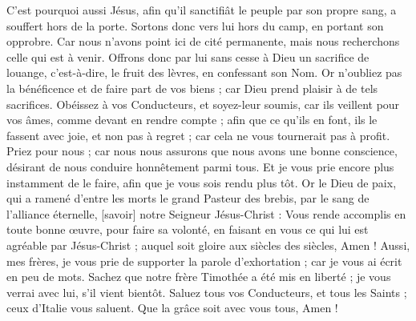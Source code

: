 \begin{multicols}{2}
C'est pourquoi aussi Jésus, afin qu'il sanctifiât le peuple par son propre sang, a souffert hors de la porte.
Sortons donc vers lui hors du camp, en portant son opprobre.
Car nous n'avons point ici de cité permanente, mais nous recherchons celle qui est à venir.
Offrons donc par lui sans cesse à Dieu un sacrifice de louange, c'est-à-dire, le fruit des lèvres, en confessant son Nom.
Or n'oubliez pas la bénéficence et de faire part de vos biens ; car Dieu prend plaisir à de tels sacrifices.
Obéissez à vos Conducteurs, et soyez-leur soumis, car ils veillent pour vos âmes, comme devant en rendre compte ; afin que ce qu'ils en font, ils le fassent avec joie, et non pas à regret ; car cela ne vous tournerait pas à profit.
Priez pour nous ; car nous nous assurons que nous avons une bonne conscience, désirant de nous conduire honnêtement parmi tous.
Et je vous prie encore plus instamment de le faire, afin que je vous sois rendu plus tôt.
Or le Dieu de paix, qui a ramené d'entre les morts le grand Pasteur des brebis, par le sang de l'alliance éternelle, [savoir] notre Seigneur Jésus-Christ :
Vous rende accomplis en toute bonne œuvre, pour faire sa volonté, en faisant en vous ce qui lui est agréable par Jésus-Christ ; auquel soit gloire aux siècles des siècles, Amen !
Aussi, mes frères, je vous prie de supporter la parole d'exhortation ; car je vous ai écrit en peu de mots.
Sachez que notre frère Timothée a été mis en liberté ; je vous verrai avec lui, s'il vient bientôt.
Saluez tous vos Conducteurs, et tous les Saints ; ceux d'Italie vous saluent.
Que la grâce soit avec vous tous, Amen !
\PPE{}
\end{multicols}
